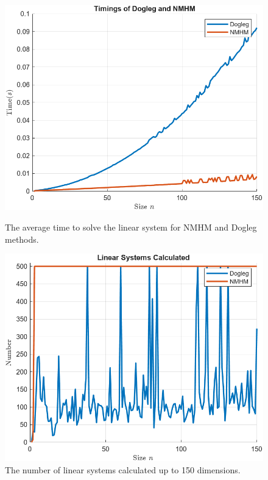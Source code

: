 \vspace{1cm}
 \begin{figure}[!htb]
  \centering
  \begin{minipage}{0.4\textwidth}
    \centering
    \includegraphics[width=\linewidth]{Plots/timings_diff.png}
    \caption{ The average time to solve the linear system for NMHM and Dogleg methods.}
    \label{fig:img1}
  \end{minipage}\hfill
  \begin{minipage}{0.4\textwidth}
    \centering
    \includegraphics[width=\linewidth]{Plots/num_lin_sys.png}
    \caption{The number of linear systems calculated up to 150 dimensions.}
    \label{fig:img2}
  \end{minipage}
\end{figure}
\newpage
